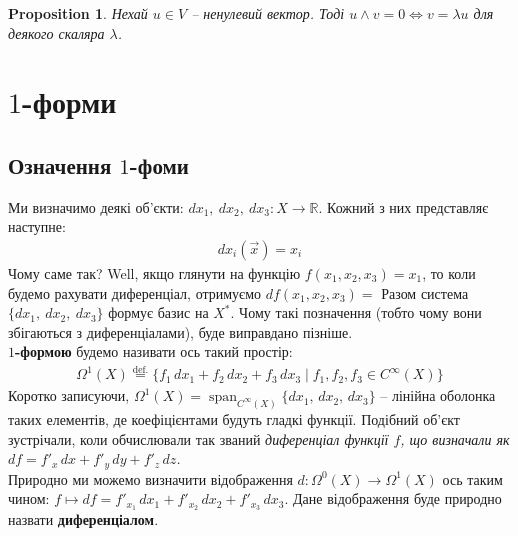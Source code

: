 \documentclass[a4paper, 10pt]{article}
\theoremstyle{theoremdd}
\theoremstyle{theoremdd}
\theoremstyle{theoremdd}
\theoremstyle{theoremdd}
\theoremstyle{theoremdd}
\theoremstyle{theoremdd}
\newtheorem{proposition}[theorem]{Proposition}
\theoremstyle{theoremdd}
\theoremstyle{theoremdd}
\theoremstyle{theoremdd}
\DeclareMathOperator{\linspan}{span}
\begin{document}
\begin{proposition}
Нехай $u \in V$ -- ненулевий вектор. Тоді $u \wedge v = 0 \iff v = \lambda u$ для деякого скаляра $\lambda$.
\end{proposition}

\newpage
\section{$1$-форми}
\subsection{Означення $1$-фоми}
Ми визначимо деякі об'єкти: $dx_1,\ dx_2,\ dx_3 \colon X \to \mathbb{R}$. Кожний з них представляє наступне:
\begin{align*}
dx_i(\vec{x}) = x_i
\end{align*}
Чому саме так? Well, якщо глянути на функцію $f(x_1,x_2,x_3) = x_1$, то коли будемо рахувати диференціал, отримуємо $df(x_1,x_2,x_3) = $
Разом система $\{dx_1,\ dx_2,\ dx_3\}$ формує базис на $X^*$. Чому такі позначення (тобто чому вони збігаються з диференціалами), буде виправдано пізніше.\\
\textbf{$1$-формою} будемо називати ось такий простір:
\begin{align*}
\Omega^1(X) \overset{\text{def.}}{=} \{ f_1\,dx_1 + f_2\,dx_2 + f_3\,dx_3 \mid f_1,f_2,f_3 \in C^\infty(X) \}
\end{align*}
Коротко записуючи, $\Omega^1(X) = \linspan_{C^\infty(X)}\{dx_1,\, dx_2,\, dx_3\}$ -- лінійна оболонка таких елементів, де коефіцієнтами будуть гладкі функції. Подібний об'єкт зустрічали, коли обчислювали так званий \textit{диференціал функції $f$, що визначали як $df = f'_x\,dx + f'_y\,dy + f'_z\,dz$.}
\bigskip \\
Природно ми можемо визначити відображення $d \colon \Omega^0(X) \to \Omega^1(X)$ ось таким чином: $f \mapsto df = f'_{x_1}\,dx_1 + f'_{x_2}\,dx_2 + f'_{x_3}\,dx_3$. Дане відображення буде природно назвати \textbf{диференціалом}.
\end{document}
